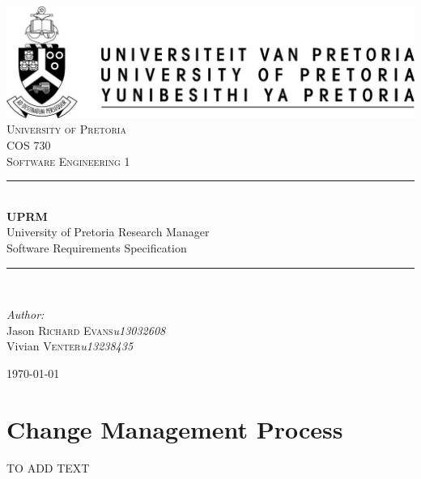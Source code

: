 \documentclass[12pt]{article}
\begin{document}
	\begin{titlepage}
		\newcommand{\HRule}{\rule{\linewidth}{0.5mm}}
		\center
		
		\includegraphics{up-logo.jpg} \\[1cm]
		
		\textsc{\LARGE University of Pretoria}\\[1.5cm]
		\textsc{\Large COS 730}\\[0.5cm]
		\textsc{\large Software Engineering 1}\\[0.5cm]

		\HRule \\[0.4cm]
		{ \huge \bfseries UPRM}\\[0.4cm]
		{\large University of Pretoria Research Manager}\\
		{Software Requirements Specification}\\

		\HRule \\[1.5cm]
		
		\begin{minipage}{1\textwidth}
			\begin{flushleft} \large
				\emph{Author:}\\
				Jason \textsc{Richard Evans}\hfill \emph{u13032608}\\
				Vivian \textsc{Venter}\hfill \emph{u13238435} \\[1cm]
			\end{flushleft}
		\end{minipage}
		
		\vfill
		{\large \today}\\[6cm]
		\vfill	
	\end{titlepage}

	\tableofcontents

	
	

	

	

	\section{Change Management Process}
	TO ADD TEXT

	
	
\end{document}
